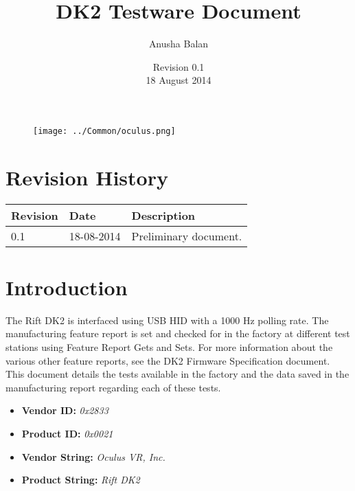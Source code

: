 \documentclass[letterpaper]{article}
\begin{document}
\title{\huge DK2 Testware Document}
\author{Anusha Balan}
\date{Revision 0.1\\
18 August 2014}

\begin{figure}
\texttt{[image: ../Common/oculus.png]}
\end{figure}

\maketitle
\thispagestyle{empty}

\cfoot{}
\rfoot{\thepage}

\newpage

\tableofcontents

\newpage

\section{Revision History}

\begin{center}
    \begin{tabular}{ | l | l | p{8cm} |}
    \hline
    \cellcolor{lightgray} Revision & \cellcolor{lightgray} Date & \cellcolor{lightgray} Description \\ \hline
    0.1 & 18-08-2014 & Preliminary document. \\ \hline
    \end{tabular}
\end{center}

\newpage

\section{Introduction}

The Rift DK2 is interfaced using USB HID with a 1000 Hz polling rate.  The manufacturing feature report is set and checked for in the factory at different test stations using Feature Report Gets and Sets.  For more information about the various other feature reports, see the DK2 Firmware Specification document. This document details the tests available in the factory and the data saved in the manufacturing report regarding each of these tests. 

\begin{itemize}
    \item {\bfseries Vendor ID:} {\em 0x2833}
    \item {\bfseries Product ID:} {\em 0x0021}
    \item {\bfseries Vendor String:} {\em Oculus VR, Inc.}
    \item {\bfseries Product String:} {\em Rift DK2}
\end{itemize}
\end{document}
